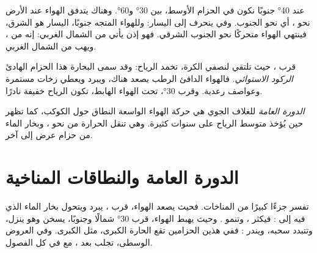 \begin{example}\label{ex:g8:winds-global-circulation:40s}
عند \ang{40} جنوبًا نكون في الحزام الأوسط، بين \ang{30} و\ang{60}.
وهناك يتدفق الهواء عند الأرض نحو ، أي نحو الجنوب. وفي 
ينحرف إلى اليسار: وللهواء المتجه جنوبًا، اليسار هو الشرق، فينتهي الهواء
متحركًا نحو الجنوب الشرقي. فهو إذن يأتي من الشمال الغربي: إنه من ، ويهب من الشمال الغربي.
\end{example}

قرب ، حيث تلتقي  لنصفي الكرة، تخمد الرياح: وقد
سمى البحارة هذا الحزام الهادئ \emph{الركود الاستوائي}. فالهواء الدافئ الرطب
يصعد هناك، ويبرد ويعطي زخات مستمرة وعواصف رعدية. وقرب \ang{30}، تحت
الهواء الهابط، تكون الرياح خفيفة  نادرًا.

\begin{definition}\label{def:g8:winds-global-circulation:circulation}
\emph{الدورة العامة} للغلاف الجوي هي حركة الهواء الواسعة
النطاق حول الكوكب، كما تظهر حين يُؤخذ متوسط الرياح على سنوات كثيرة. وهي
تنقل الحرارة من  نحو ، وبخار الماء من حزام عرض إلى
آخر.
\end{definition}

\section{الدورة العامة والنطاقات المناخية}

تفسر  جزءًا كبيرًا من  المناخات. فحيث يصعد الهواء، قرب
، يبرد ويتحول بخار الماء الذي فيه إلى : فيكثر ، وتنمو
. وحيث يهبط الهواء، قرب \ang{30} شمالًا وجنوبًا، يسخن وهو
ينزل، وتتبدد سحبه، ويندر : ففي هذين الحزامين تقع  الحارة
الكبرى، مثل  الكبرى. وفي العروض الوسطى، تجلب  
بعد ، مع  في كل الفصول.

